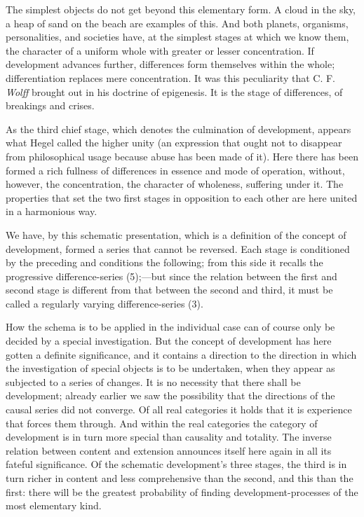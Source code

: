 \documentclass[12pt,a4paper]{book}
\newcommand{\opage}[1]{\marginnote{\footnotesize\textit{[#1]}}}
\begin{document}
The simplest objects do not get beyond this elementary form. A cloud in the
sky, a heap of sand on the beach are examples of this. And both planets,
organisms, personalities, and societies have, at the simplest stages at which
we know them, the character of a uniform whole with greater or lesser
concentration. If development advances further, differences form themselves
within the whole; differentiation replaces mere concentration. It was this
peculiarity that C. F. \emph{Wolff} brought out in his doctrine of
epigenesis. It is the stage of differences, of breakings and crises.

As the third chief stage, which denotes the culmination of development,
appears what Hegel called the higher unity (an expression that ought not to
disappear from philosophical usage because abuse has been made of it). Here
there has been formed a rich fullness of differences in essence and mode of
operation, without, however, the concentration, the character of wholeness,
suffering under it. The properties that set the two first stages in
opposition to each other are here united in a harmonious way.

We have, by this schematic presentation, which is a definition of the concept
of development, formed a series that cannot be reversed. Each stage is
conditioned by the preceding and conditions the following; from this side \opage{234}it
recalls the progressive difference-series (5);---but since the relation
between the first and second stage is different from that between the second
and third, it must be called a regularly varying difference-series (3).

How the schema is to be applied in the individual case can of course only be
decided by a special investigation. But the concept of development has here
gotten a definite significance, and it contains a direction to the direction
in which the investigation of special objects is to be undertaken, when they
appear as subjected to a series of changes. It is no necessity that there
shall be development; already earlier we saw the possibility that the
directions of the causal series did not converge. Of all real categories it
holds that it is experience that forces them through. And within the real
categories the category of development is in turn more special than causality
and totality. The inverse relation between content and extension announces
itself here again in all its fateful significance. Of the schematic
development's three stages, the third is in turn richer in content and less
comprehensive than the second, and this than the first: there will be the
greatest probability of finding development-processes of the most elementary
kind.
\end{document}
